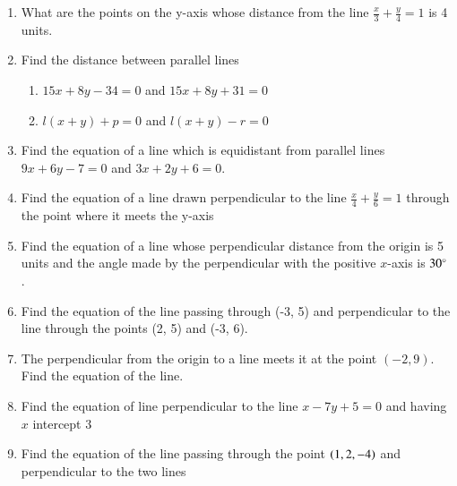 \begin{enumerate}[label=\thesubsection.\arabic*, ref=\thesubsection.\theenumi]
	\solution

\item What are the points on the y-axis whose distance from the line $\frac{x}{3}+\frac{y}{4}=1$ is 4 units.
\\
\solution
		
\item Find the distance between parallel lines
\label{chapters/11/10/3/6}
\begin{enumerate}
	\item $15x+8y-34=0$ and  $15x+8y+31=0$ \\
	\item  $l(x+y)+p=0$ and  $l(x+y)-r=0$
\end{enumerate}
	\solution

\item Find the equation of a line which is equidistant from parallel lines $9x+6y-7=0$ and $3x+2y+6=0$.
\\
\solution
		
\item Find the equation of a line  drawn perpendicular to the line $\frac{x}{4}+\frac{y}{6}=1$ through the point where it meets the y-axis \\
\solution
		
\item Find the equation of a line whose perpendicular distance from the origin is 5 units and the angle made by the perpendicular with the positive $x$-axis is $30\degree$.
\label{chapters/11/10/2/8}
\\
\solution

\item 
	Find the equation of the line passing through  (-3, 5) and perpendicular to the line through the points (2, 5) and (-3, 6).
	\\
	\solution 
\label{chapters/11/10/2/10}

\item 
	The perpendicular from the origin to a line meets it at the point $(-2, 9)$. Find the equation of the line.
\label{chapters/11/10/2/15}
	\\
	\solution

\item Find the equation of line perpendicular to the line $x-7y+5=0$ and having $x$ intercept $3$\\
\label{chapters/11/10/3/8}
\solution

	\item Find the equation of the line passing through the point $\left(1, 2, -4\right)$ and perpendicular to the two lines
\begin{align}

\end{align}
\end{enumerate}
